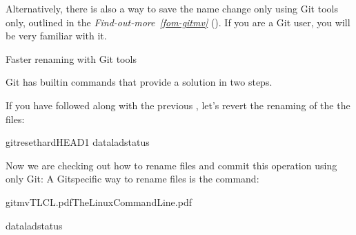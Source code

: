 \sphinxAtStartPar
Alternatively, there is also a way to save the name change
only using Git tools only, outlined in the \textit{Find-out-more}~{\findoutmoreiconinline}\textit{\ref{fom-gitmv}} {\hyperref[\detokenize{basics/101-136-filesystem:fom-gitmv}]{}} (). If you are a Git user, you will be very familiar with it.

\ignorespaces \begin{findoutmore}[label={fom-gitmv}, before title={\thetcbcounter\ }, check odd page=true]{Faster renaming with Git tools}
\label{\detokenize{basics/101-136-filesystem:fom-gitmv}}

\sphinxAtStartPar
Git has built\sphinxhyphen{}in commands that provide a solution in two steps.

\sphinxAtStartPar
If you have followed along with the previous , let’s revert the renaming of the the files:

\begin{sphinxVerbatim}[commandchars=\\\{\}]
gitreset\PYGZhy{}\PYGZhy{}hardHEAD\PYGZti{}1
dataladstatus
\end{sphinxVerbatim}

\sphinxAtStartPar
Now we are checking out how to rename files and commit this operation
using only Git:
A Git\sphinxhyphen{}specific way to rename files is the  command:

\begin{sphinxVerbatim}[commandchars=\\\{\}]
gitmvTLCL.pdfThe\PYGZus{}Linux\PYGZus{}Command\PYGZus{}Line.pdf
\end{sphinxVerbatim}

\begin{sphinxVerbatim}[commandchars=\\\{\}]
dataladstatus
\end{sphinxVerbatim}


\end{findoutmore}
